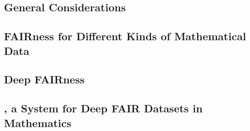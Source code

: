 

\subsection{General Considerations}
 

\subsection{FAIRness for Different Kinds of Mathematical Data}
 

\subsection{Deep FAIRness}\label{sec:deep}
 

\subsection{\dmh, a System for Deep FAIR Datasets in Mathematics}\label{sec:hub}
 

